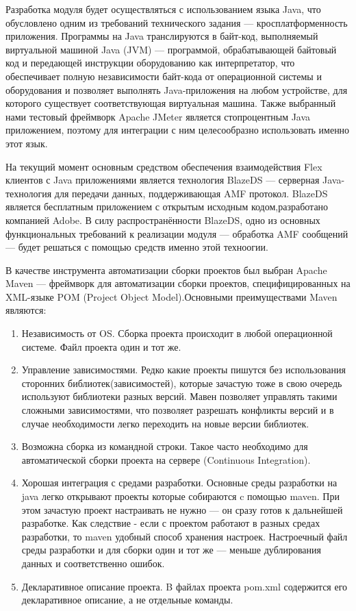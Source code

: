 Разработка модуля будет осуществляться с использованием языка Java, что обусловлено одним из требований технического
задания --- кросплатформенность приложения. Программы на Java транслируются в байт-код, выполняемый виртуальной машиной
Java (JVM) --- программой, обрабатывающей байтовый код и передающей инструкции оборудованию как интерпретатор, что
обеспечивает полную независимости байт-кода от операционной системы и оборудования и позволяет выполнять
Java-приложения на любом устройстве, для которого существует соответствующая виртуальная машина. Также выбранный нами
тестовый фреймворк Apache JMeter является стопроцентным Java приложением, поэтому для интеграции с ним целесообразно
использовать именно этот язык.

На текущий момент основным средством обеспечения взаимодействия Flex клиентов с Java приложениями является технология
BlazeDS --- серверная Java-технология для передачи данных, поддерживающая AMF протокол. BlazeDS является бесплатным
приложением с открытым исходным кодом,разработано компанией Adobe. В силу распространённости BlazeDS, одно из основных
функциональных требований к реализации модуля --- обработка AMF сообщений --- будет решаться с помощью средств именно
этой техноогии.

В качестве инструмента автоматизации сборки проектов был выбран Apache Maven --- фреймворк для автоматизации сборки
проектов, специфицированных на XML-языке POM (Project Object Model).Основными преимуществами Maven являются:

\begin{enumerate}
\item Независимость от OS. Сборка проекта происходит в любой операционной системе. Файл проекта один и тот же.
\item Управление зависимостями. Редко какие проекты пишутся без использования сторонних библиотек(зависимостей), которые
 зачастую тоже в свою очередь используют библиотеки разных версий. Мавен позволяет управлять такими сложными
 зависимостями, что позволяет разрешать конфликты версий и в случае необходимости легко переходить на новые версии
 библиотек.
\item Возможна сборка из командной строки. Такое часто необходимо для автоматической сборки проекта на сервере
(Continuous Integration).
\item Хорошая интеграция с средами разработки. Основные среды разработки на java легко открывают проекты которые
собираются c помощью maven. При этом зачастую проект настраивать не нужно --- он сразу готов к дальнейшей разработке.
Как следствие - если с проектом работают в разных средах разработки, то maven удобный способ хранения настроек.
Настроечный файл среды разработки и для сборки один и тот же --- меньше дублирования данных и соответственно ошибок.
\item Декларативное описание проекта. B файлах проекта pom.xml содержится его декларативное описание, а не отдельные
команды.
\end{enumerate}

